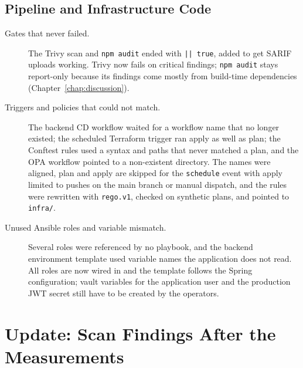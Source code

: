 \subsection{Pipeline and Infrastructure Code}
\begin{description}
  \item[Gates that never failed.] The Trivy scan and \texttt{npm audit} ended with \texttt{|| true}, added to get SARIF uploads working. Trivy now fails on critical findings; \texttt{npm audit} stays report-only because its findings come mostly from build-time dependencies (Chapter~\ref{chap:discussion}).
  \item[Triggers and policies that could not match.] The backend CD workflow waited for a workflow name that no longer existed; the scheduled Terraform trigger ran apply as well as plan; the Conftest rules used a syntax and paths that never matched a plan, and the OPA workflow pointed to a non-existent directory. The names were aligned, plan and apply are skipped for the \texttt{schedule} event with apply limited to pushes on the main branch or manual dispatch, and the rules were rewritten with \texttt{rego.v1}, checked on synthetic plans, and pointed to \texttt{infra/}.
  \item[Unused Ansible roles and variable mismatch.] Several roles were referenced by no playbook, and the backend environment template used variable names the application does not read. All roles are now wired in and the template follows the Spring configuration; vault variables for the application user and the production JWT secret still have to be created by the operators.
\end{description}

\section{Update: Scan Findings After the Measurements}

